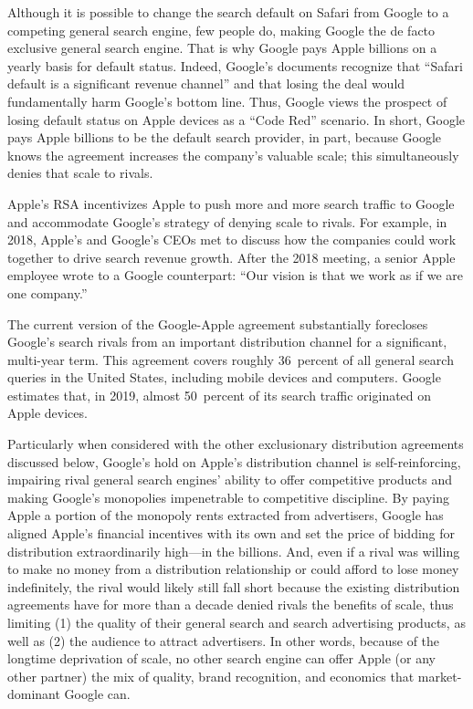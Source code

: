 \documentclass[11pt,b5paper,headings=small]{scrartcl}
\begin{document}
Although it is possible to change the search default on Safari from Google to a
competing general search engine, few people do, making Google the de facto exclusive general
search engine. That is why Google pays Apple billions on a yearly basis for default status.
Indeed, Google’s documents recognize that “Safari default is a significant revenue channel” and
that losing the deal would fundamentally harm Google’s bottom line. Thus, Google views the
prospect of losing default status on Apple devices as a “Code Red” scenario. In short, Google
pays Apple billions to be the default search provider, in part, because Google knows the
agreement increases the company’s valuable scale; this simultaneously denies that scale to rivals.


Apple’s RSA incentivizes Apple to push more and more search traffic to Google
and accommodate Google’s strategy of denying scale to rivals. For example, in 2018, Apple’s
and Google’s CEOs met to discuss how the companies could work together to drive search
revenue growth. After the 2018 meeting, a senior Apple employee wrote to a Google
counterpart: “Our vision is that we work as if we are one company.”


The current version of the Google-Apple agreement substantially forecloses
Google's search rivals from an important distribution channel for a significant, multi-year term.
This agreement covers roughly 36~percent of all general search queries in the United States,
including mobile devices and computers. Google estimates that, in 2019, almost 50~percent of its
search traffic originated on Apple devices.


Particularly when considered with the other exclusionary distribution agreements
discussed below, Google’s hold on Apple’s distribution channel is self-reinforcing, impairing
rival general search engines’ ability to offer competitive products and making Google’s
monopolies impenetrable to competitive discipline. By paying Apple a portion of the monopoly
rents extracted from advertisers, Google has aligned Apple’s financial incentives with its own
and set the price of bidding for distribution extraordinarily high—in the billions. And, even if a
rival was willing to make no money from a distribution relationship or could afford to lose
money indefinitely, the rival would likely still fall short because the existing distribution
agreements have for more than a decade denied rivals the benefits of scale, thus limiting (1) the
quality of their general search and search advertising products, as well as (2) the audience to
attract advertisers. In other words, because of the longtime deprivation of scale, no other search
engine can offer Apple (or any other partner) the mix of quality, brand recognition, and
economics that market-dominant Google can.
\end{document}

